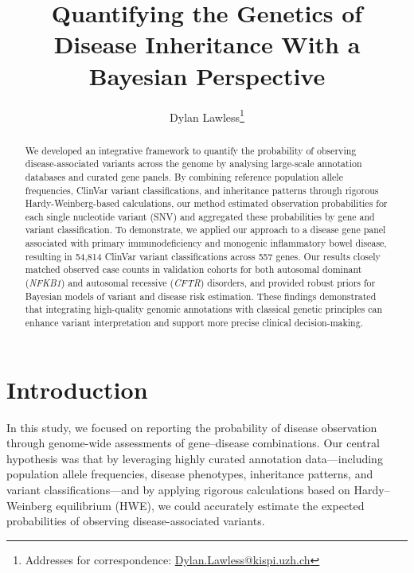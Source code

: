 
\usepackage[printonlyused,withpage,nohyperlinks]{acronym}
\usepackage{tikz}
\usetikzlibrary{calc}
\usepackage{amsmath, amssymb}


\title{Quantifying the Genetics of Disease Inheritance With a Bayesian Perspective}

\author[1]{Dylan Lawless\thanks{Addresses for correspondence: \href{mailto:Dylan.Lawless@kispi.uzh.ch}{Dylan.Lawless@kispi.uzh.ch}}}


\maketitle
\justify

\begin{abstract}
We developed an integrative framework to quantify the probability of observing disease-associated variants across the genome by analysing large-scale annotation databases and curated gene panels. By combining reference population allele frequencies, ClinVar variant classifications, and inheritance patterns through rigorous Hardy-Weinberg-based calculations, our method estimated observation probabilities for each single nucleotide variant (SNV) and aggregated these probabilities by gene and variant classification. To demonstrate, we applied our approach to a disease gene panel  associated with primary immunodeficiency and monogenic inflammatory bowel disease, resulting in 54,814 ClinVar variant classifications across 557 genes. Our results closely matched observed case counts in validation cohorts for both autosomal dominant (\textit{NFKB1}) and autosomal recessive (\textit{CFTR}) disorders, and provided robust priors for Bayesian models of variant and disease risk estimation. These findings demonstrated that integrating high-quality genomic annotations with classical genetic principles can enhance variant interpretation and support more precise clinical decision-making.
\end{abstract}
\clearpage

\section{Introduction}

In this study, we focused on reporting the probability of disease observation through genome-wide assessments of gene–disease combinations. Our central hypothesis was that by leveraging highly curated annotation data—including population allele frequencies, disease phenotypes, inheritance patterns, and variant classifications—and by applying rigorous calculations based on Hardy–Weinberg equilibrium (HWE), we could accurately estimate the expected probabilities of observing disease-associated variants.

